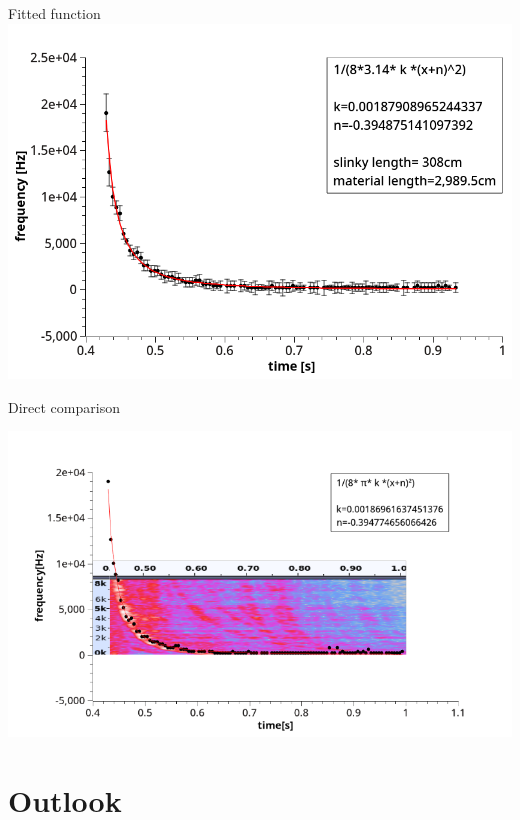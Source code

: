 \documentclass{beamer}
\begin{document}
	\begin{frame}{Fitted function}
		\includegraphics [scale=0.38]{images/legend_and_errors.png}
		
	\end{frame}
	
	\begin{frame}{Direct comparison}
		\begin{center}
			\includegraphics [scale=0.58]{images/comparison.png}
		\end{center}		
	\end{frame}


\section {Outlook}
\end{document}
